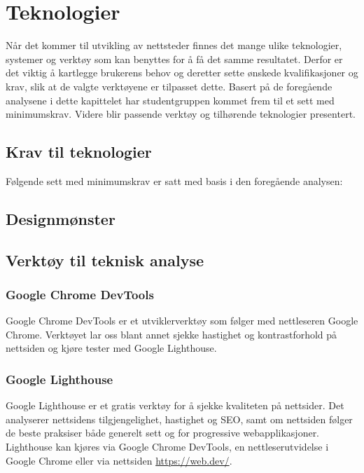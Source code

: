 \section{Teknologier}
Når det kommer til utvikling av nettsteder finnes det mange ulike teknologier, systemer og verktøy som kan benyttes for å få det samme resultatet. Derfor er det viktig å kartlegge brukerens behov og deretter sette ønskede kvalifikasjoner og krav, slik at de valgte verktøyene er tilpasset dette. Basert på de foregående analysene i dette kapittelet har studentgruppen kommet frem til et sett med minimumskrav. Videre blir passende verktøy og tilhørende teknologier presentert.

\subsection{Krav til teknologier}
Følgende sett med minimumskrav er satt med basis i den foregående analysen:


\subsection{Designmønster}

\subsection{Verktøy til teknisk analyse}

\subsubsection{Google Chrome DevTools}
\label{sec:google-chrome-devtools}
Google Chrome DevTools \cite{google2019cdt} er et utviklerverktøy som følger med nettleseren Google Chrome. Verktøyet lar oss blant annet sjekke hastighet og kontrastforhold på nettsiden og kjøre tester med Google Lighthouse.

\subsubsection{Google Lighthouse}
\label{sec:google-lighthouse}
Google Lighthouse \cite{google2018lig} er et gratis verktøy for å sjekke kvaliteten på nettsider. Det analyserer nettsidens tilgjengelighet, hastighet og SEO, samt om nettsiden følger de beste praksiser både generelt sett og for progressive webapplikasjoner. Lighthouse kan kjøres via Google Chrome DevTools, en nettleserutvidelse i Google Chrome eller via nettsiden \url{https://web.dev/}.

